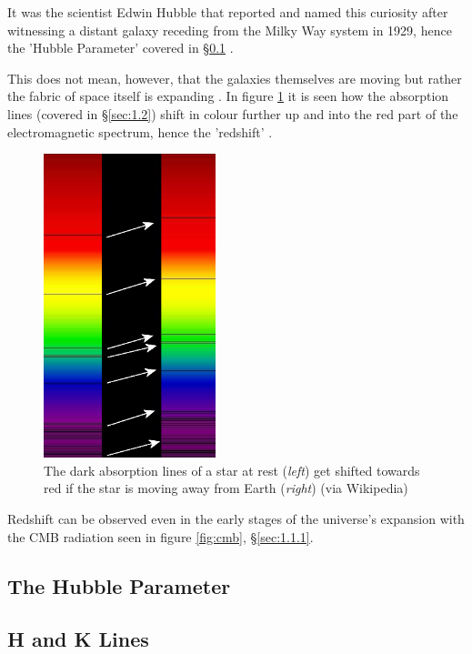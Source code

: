 \documentclass[12pt]{article}
\begin{document}
It was the scientist Edwin Hubble that reported and named this curiosity after witnessing a distant galaxy receding from the Milky Way system in 1929, hence the 
'Hubble Parameter' covered in §\ref{sec:1.3}
\cite{britredshift}.

This does not mean, however, that the galaxies themselves are moving but rather the fabric of space itself is expanding
\cite{esaredshift}.
In figure \ref{fig:redshift} it is seen how the absorption lines (covered in §\ref{sec:1.2}) shift in colour further up and into the red part
of the electromagnetic spectrum, hence the 'redshift'
\cite{earthskyredshift}.

\begin{figure}[H]
    \centering
    \includegraphics[width=5cm]{Redshift.png}
    \caption{\centering \footnotesize{The dark absorption lines of a star at rest (\textit{left}) get shifted towards red if the star is moving away from Earth (\textit{right}) \protect\cite{earthskyredshift} (via Wikipedia)}}
    \label{fig:redshift}
\end{figure}

Redshift can be observed even in the early stages of the universe's expansion with the CMB radiation seen in figure \ref{fig:cmb}, §\ref{sec:1.1.1}.

\subsection{The Hubble Parameter} \label{sec:1.3}



\subsection{H and K Lines} \label{sec:1.4}
\end{document}

